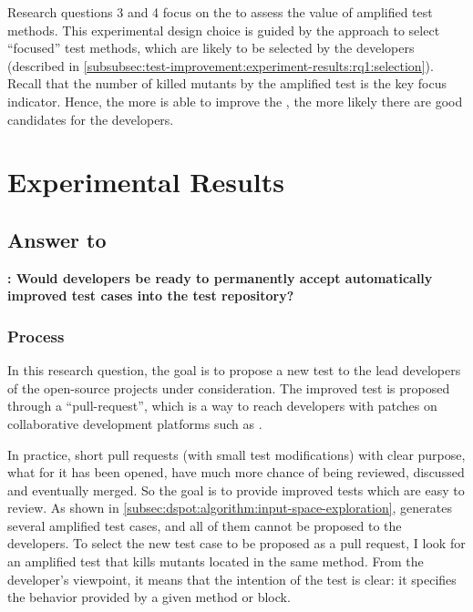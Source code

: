 Research questions 3 and 4 focus on the \ms to assess the value of amplified test methods.
This experimental design choice is guided by the approach to select ``focused'' test methods, which are likely to be selected by the developers (described in \autoref{subsubsec:test-improvement:experiment-results:rq1:selection}). 
Recall that the number of killed mutants by the amplified test is the key focus indicator. 
Hence, the more \dspot is able to improve the \ms, the more likely there are good candidates for the developers.

\section{Experimental Results}
\label{sec:test-improvement:experiment-results}


\subsection{Answer to \rqpullrequest}
\label{subsec:test-improvement:experiment-results:rq1}

\textbf{\rqpullrequest: Would developers be ready to permanently accept automatically improved test cases into the test repository?}

\subsubsection{Process}

In this research question, the goal is to propose a new test to the lead developers of the open-source projects under consideration. 
The improved test is proposed through a ``pull-request'', which is a way to reach developers with patches on collaborative development platforms such as \gh.

In practice, short pull requests (\ie with small test modifications) with clear purpose, \ie what for it has been opened, have much more chance of being reviewed, discussed and eventually merged. 
So the goal is to provide improved tests which are easy to review.
As shown in \autoref{subsec:dspot:algorithm:input-space-exploration}, \dspot generates several amplified test cases, and all of them cannot be proposed to the developers.
To select the new test case to be proposed as a pull request, I look for an amplified test that kills mutants located in the same method.
From the developer's viewpoint, it means that the intention of the test is clear: it specifies the behavior provided by a given method or block.


